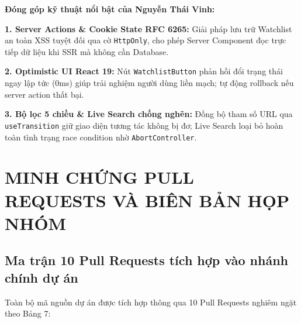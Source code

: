 \documentclass[12pt,a4paper]{extarticle}
\begin{document}
\noindent \textbf{Đóng góp kỹ thuật nổi bật của Nguyễn Thái Vinh:}

\textbf{1. Server Actions \& Cookie State RFC 6265:} Giải pháp lưu trữ Watchlist an toàn XSS tuyệt đối qua cờ \texttt{HttpOnly}, cho phép Server Component đọc trực tiếp dữ liệu khi SSR mà không cần Database.

\textbf{2. Optimistic UI React 19:} Nút \texttt{WatchlistButton} phản hồi đổi trạng thái ngay lập tức ($0$ms) giúp trải nghiệm người dùng liền mạch; tự động rollback nếu server action thất bại.

\textbf{3. Bộ lọc 5 chiều \& Live Search chống nghẽn:} Đồng bộ tham số URL qua \texttt{useTransition} giữ giao diện tương tác không bị đơ; Live Search loại bỏ hoàn toàn tình trạng race condition nhờ \texttt{AbortController}.

\newpage
\section{MINH CHỨNG PULL REQUESTS VÀ BIÊN BẢN HỌP NHÓM}

\subsection{Ma trận 10 Pull Requests tích hợp vào nhánh chính dự án}

Toàn bộ mã nguồn dự án được tích hợp thông qua 10 Pull Requests nghiêm ngặt theo Bảng 7:
\end{document}
